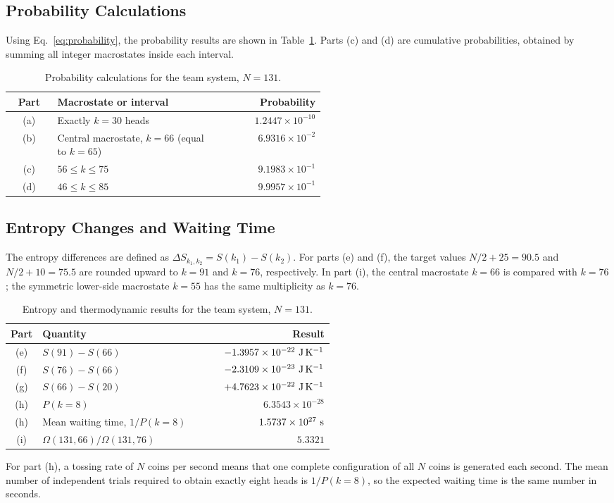 \documentclass[10pt,a4paper]{article}
\begin{document}
\subsection{Probability Calculations}
Using Eq.~\eqref{eq:probability}, the probability results are shown in Table~\ref{tab:team-probabilities}. Parts (c) and (d) are cumulative probabilities, obtained by summing all integer macrostates inside each interval.
\begin{table}[htbp]
  \centering
  \caption{Probability calculations for the team system, $N=131$.}
  \label{tab:team-probabilities}
  \small
  \begin{tabular}{c p{0.52\linewidth} r}
    \toprule
    Part & Macrostate or interval & Probability \\
    \midrule
    (a) & Exactly $k=30$ heads & $1.2447\times10^{-10}$ \\
    (b) & Central macrostate, $k=66$ (equal to $k=65$) & $6.9316\times10^{-2}$ \\
    (c) & $56\leq k\leq75$ & $9.1983\times10^{-1}$ \\
    (d) & $46\leq k\leq85$ & $9.9957\times10^{-1}$ \\
    \bottomrule
  \end{tabular}
\end{table}
\subsection{Entropy Changes and Waiting Time}
The entropy differences are defined as $\Delta S_{k_1,k_2}=S(k_1)-S(k_2)$. For parts (e) and (f), the target values $N/2+25=90.5$ and $N/2+10=75.5$ are rounded upward to $k=91$ and $k=76$, respectively. In part (i), the central macrostate $k=66$ is compared with $k=76$; the symmetric lower-side macrostate $k=55$ has the same multiplicity as $k=76$.

\begin{table}[htbp]
  \centering
  \caption{Entropy and thermodynamic results for the team system, $N=131$.}
  \label{tab:team-entropy}
  \small
  \begin{tabular}{c p{0.57\linewidth} r}
    \toprule
    Part & Quantity & Result \\
    \midrule
    (e) & $S(91)-S(66)$ & $-1.3957\times10^{-22}\ {\rm J\,K^{-1}}$ \\
    (f) & $S(76)-S(66)$ & $-2.3109\times10^{-23}\ {\rm J\,K^{-1}}$ \\
    (g) & $S(66)-S(20)$ & $+4.7623\times10^{-22}\ {\rm J\,K^{-1}}$ \\
    (h) & $P(k=8)$ & $6.3543\times10^{-28}$ \\
    (h) & Mean waiting time, $1/P(k=8)$ & $1.5737\times10^{27}\ {\rm s}$ \\
    (i) & $\Omega(131,66)/\Omega(131,76)$ & $5.3321$ \\
    \bottomrule
  \end{tabular}
\end{table}
For part (h), a tossing rate of $N$ coins per second means that one complete configuration of all $N$ coins is generated each second. The mean number of independent trials required to obtain exactly eight heads is $1/P(k=8)$, so the expected waiting time is the same number in seconds.
\end{document}
